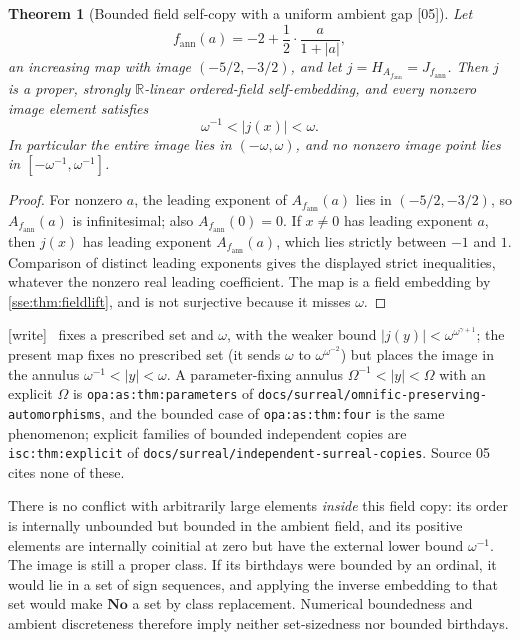 \documentclass[11pt,a4paper]{article}
\numberwithin{equation}{section}
\theoremstyle{plain}
\newtheorem{theorem}{Theorem}[section]
\theoremstyle{definition}
\theoremstyle{remark}
\newcommand{\No}{\mathbf{No}}
\newcommand{\R}{\mathbb{R}}
\newcommand{\lbl}[1]{\nolinkurl{#1}}%
\newcommand{\fn}[1]{\nolinkurl{#1}}%
\newcommand{\src}[1]{\textup{\textsf{\small[#1]}}}%
\newcommand{\wtag}{\textup{\textsf{[write]}}}%
\newenvironment{wnote}{\par\smallskip\noindent\wtag\ }{\par\smallskip}
\begin{document}
\begin{theorem}[Bounded field self-copy with a uniform ambient gap \src{05}]\label{sse:co:thm:bounded}
Let
\[
 f_{\mathrm{ann}}(a)=-2+\frac12\cdot\frac{a}{1+|a|},
\]
an increasing map with image $(-5/2,-3/2)$, and let
$j=H_{A_{f_{\mathrm{ann}}}}=J_{f_{\mathrm{ann}}}$. Then $j$ is a proper,
strongly $\R$-linear ordered-field self-embedding, and every nonzero image
element satisfies
\[
 \omega^{-1}<|j(x)|<\omega.
\]
In particular the entire image lies in $(-\omega,\omega)$, and no nonzero
image point lies in $[-\omega^{-1},\omega^{-1}]$.
\end{theorem}
\begin{proof}
For nonzero $a$, the leading exponent of $A_{f_{\mathrm{ann}}}(a)$ lies in
$(-5/2,-3/2)$, so $A_{f_{\mathrm{ann}}}(a)$ is infinitesimal; also
$A_{f_{\mathrm{ann}}}(0)=0$. If $x\ne0$ has leading exponent $a$, then $j(x)$
has leading exponent $A_{f_{\mathrm{ann}}}(a)$, which lies strictly between
$-1$ and $1$. Comparison of distinct leading exponents gives the displayed
strict inequalities, whatever the nonzero real leading coefficient. The map
is a field embedding by \cref{sse:thm:fieldlift}, and is not surjective
because it misses $\omega$.
\end{proof}
\begin{wnote}
 fixes a prescribed set and $\omega$, with the
weaker bound $|j(y)|<\omega^{\omega^{\gamma+1}}$; the present map fixes no
prescribed set (it sends $\omega$ to $\omega^{\omega^{-2}}$) but places the
image in the annulus $\omega^{-1}<|y|<\omega$. A parameter-fixing annulus
$\Omega^{-1}<|y|<\Omega$ with an explicit $\Omega$ is \lbl{opa:as:thm:parameters}
of \fn{docs/surreal/omnific-preserving-automorphisms}, and the bounded case
of \lbl{opa:as:thm:four} is the same phenomenon; explicit families of
bounded independent copies are \lbl{isc:thm:explicit} of
\fn{docs/surreal/independent-surreal-copies}. Source 05 cites none of these.
\end{wnote}
There is no conflict with arbitrarily large elements \emph{inside} this field
copy: its order is internally unbounded but bounded in the ambient field, and
its positive elements are internally coinitial at zero but have the external
lower bound $\omega^{-1}$. The image is still a proper class. If its birthdays
were bounded by an ordinal, it would lie in a set of sign sequences, and
applying the inverse embedding to that set would make $\No$ a set by class
replacement. Numerical boundedness and ambient discreteness therefore imply
neither set-sizedness nor bounded birthdays.
\end{document}
